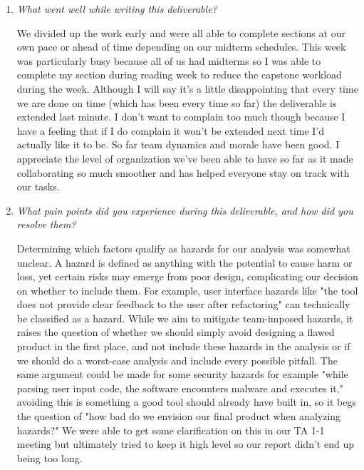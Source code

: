 \documentclass{article}
\begin{document}
\begin{enumerate}
  \item \textit{What went well while writing this deliverable?}
  
  We divided up the work early and were all able to complete sections at our own 
  pace or ahead of time depending on our midterm schedules. This week was 
  particularly busy because all of us had midterms so I was able to complete 
  my section during reading week to reduce the capstone workload during the week. 
  Although I will say it's a little disappointing that every time we are done on 
  time (which has been every time so far) the deliverable is extended last minute. 
  I don't want to complain too much though because I have a feeling that if I do 
  complain it won't be extended next time I'd actually like it to be. So far team 
  dynamics and morale have been good. I appreciate the level of organization we've 
  been able to have so far as it made collaborating so much smoother and has helped 
  everyone stay on track with our tasks.

  \item \textit{What pain points did you experience during this deliverable, and how did you resolve them?}
  
  Determining which factors qualify as hazards for our analysis was somewhat unclear.
  A hazard is defined as anything with the potential to cause harm or loss, yet certain    
  risks may emerge from poor design, complicating our decision on whether to include them.    
  For example, user interface hazards like "the tool does not provide clear feedback    
  to the user after refactoring" can technically be classified as a hazard. While we    
  aim to mitigate team-imposed hazards, it raises the question of whether we should    
  simply avoid designing a flawed product in the first place, and not include these    
  hazards in the analysis or if we should do a worst-case analysis and include every    
  possible pitfall. The same argument could be made for some security hazards for example    
  "while parsing user input code, the software encounters malware and executes it,"    
  avoiding this is something a good tool should already have built in, so it begs    
  the question of "how bad do we envision our final product when analyzing hazards?"    
  We were able to get some clarification on this in our TA 1-1 meeting but ultimately    
  tried to keep it high level so our report didn't end up being too long.

\end{enumerate}
\end{document}
